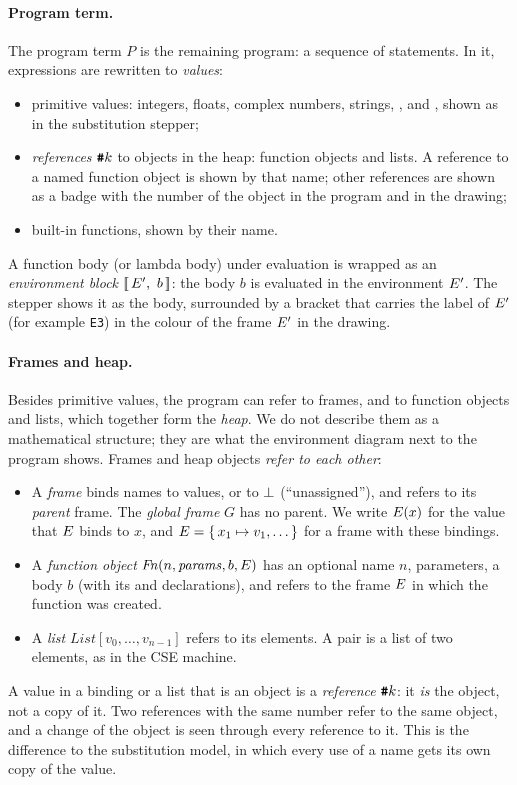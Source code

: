 \paragraph{Program term.} The program term $P$ is the remaining program: a
sequence of statements. In it, expressions are rewritten to \emph{values}:
\begin{itemize}
\item primitive values: integers, floats, complex numbers, strings,
  ,  and , shown as in the substitution
  stepper;
\item \emph{references} $\textbf{\texttt{\#}}k$ to objects in the heap: function objects
  and lists. A reference to a named function object is shown by that name;
  other references are shown as a badge with the number of the object
  in the program and in the drawing;
\item built-in functions, shown by their name.
\end{itemize}
A function body (or lambda body) under evaluation is wrapped as an
\emph{environment block} $[\![\,E',\ b\,]\!]$: the body $b$ is evaluated in
the environment $E'$. The stepper shows it as the body, surrounded by a
bracket that carries the label of $E'$ (for example \texttt{E3}) in the
colour of the frame $E'$ in the drawing.

\paragraph{Frames and heap.} Besides primitive values, the program can refer
to frames, and to function objects and lists, which together form the
\emph{heap}. We do not describe them as a mathematical structure; they are what
the environment diagram next to the program shows. Frames and heap objects
\emph{refer to each other}:
\begin{itemize}
\item A \emph{frame} binds names to values, or to $\bot$ (``unassigned''),
  and refers to its \emph{parent} frame. The \emph{global frame} $G$ has no
  parent. We write $E(x)$ for the value that $E$ binds to $x$, and
  $E = \{\, x_1 \mapsto v_1, \ldots \,\}$ for a frame with these bindings.
\item A \emph{function object} $\mathit{Fn}(n, \mathit{params}, b, E)$ has
  an optional name $n$, parameters, a body $b$ (with its  and
   declarations), and refers to the frame
  $E$ in which the function was created.
\item A \emph{list} $\mathit{List}[v_0, \ldots, v_{n-1}]$ refers to its
  elements. A pair is a list of two elements, as in the CSE machine.
\end{itemize}
A value in a binding or a list that is an object is a \emph{reference}
$\textbf{\texttt{\#}}k$: it \emph{is} the object, not a copy of it. Two references with the
same number refer to the same object, and a change of the object is seen
through every reference to it. This is the difference to the substitution
model, in which every use of a name gets its own copy of the value.

